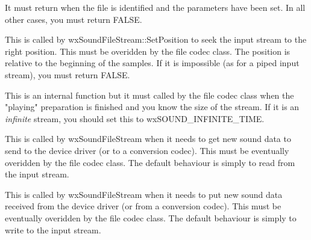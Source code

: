 It must return when the file is identified and the parameters have
been set. In all other cases, you must return FALSE.

\label{wxsoundfilestreampreparetorecord}

\label{wxsoundfilestreamfinishrecording}

\label{wxsoundfilestreamrepositionstream}

This is called by wxSoundFileStream::SetPosition to seek the input stream
to the right position. This must be overidden by the file codec class.
The position is relative to the beginning of the samples.
If it is impossible (as for a piped input stream), you must return FALSE.

\label{wxsoundfilestreamfinishpreparation}

This is an internal function but it must called by the file codec class when
the "playing" preparation is finished and you know the size of the stream.
If it is an {\it infinite} stream, you should set this to wxSOUND\_INFINITE\_TIME.

\label{wxsoundfilestreamgetdata}

This is called by wxSoundFileStream when it needs to get new sound data to
send to the device driver (or to a conversion codec). This must be eventually
overidden by the file codec class. The default behaviour is simply to read from
the input stream.

\label{wxsoundfilestreamputdata}

This is called by wxSoundFileStream when it needs to put new sound data received
from the device driver (or from a conversion codec). This must be eventually
overidden by the file codec class. The default behaviour is simply to write to
the input stream.
